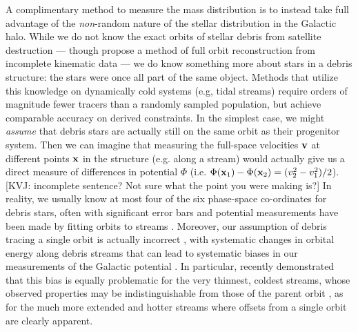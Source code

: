 \documentclass[preprint]{aastex}
\begin{document}
A complimentary method to measure the mass distribution is to instead take full advantage of the {\it non}-random nature of the stellar distribution in the Galactic halo.
While we do not know the exact orbits of  stellar debris from satellite destruction --- though \citet{eyre09b} propose a method of full orbit reconstruction from incomplete kinematic data --- we do know something more about stars in a debris structure: the stars were once all part of the same object.
Methods that utilize this knowledge on dynamically cold systems (e.g, tidal streams) require orders of magnitude fewer tracers than a randomly sampled population, but achieve comparable accuracy on derived constraints.
In the simplest case, we might {\it assume} that debris stars are actually still on the same orbit as their progenitor system.
Then we can imagine that measuring the full-space velocities ${\bf v}$ at different points ${\bf x}$ in the structure (e.g. along a stream) would actually give us a direct
measure of differences in potential $\Phi$ (i.e. $\Phi({\bf x}_1)-\Phi({\bf x}_2)=(v_2^2-v_1^2)/2$).
[KVJ: incomplete sentence? Not sure what the point you were making is?] In reality, we usually know at most four of the six phase-space co-ordinates for debris stars, often with significant error bars and potential measurements have been made by fitting orbits to streams \citep[e.g.,][]{helmi04,johnston05,koposov10,law10}.
Moreover, our assumption of debris tracing a single orbit is actually incorrect \citep[see][for discussions of the orbit distribution in tidal debris]{johnston98,helmi99}, with
systematic changes in orbital energy along debris streams that can lead to systematic biases in our measurements of the Galactic potential \citep{eyre09a,varghese11}.
In particular, \citet{sanders13a} recently demonstrated that this bias is equally problematic for the very thinnest, coldest streams, whose observed properties may be indistinguishable from those of the parent orbit \citep[e.g. such as the globular cluster, GD1 --- see][]{koposov10}, as for the much more extended and hotter streams \citep[e.g. such as debris from the Sagittarius dwarf galaxy --- see][]{majewski03} where offsets from a single orbit are clearly apparent.
\end{document}

